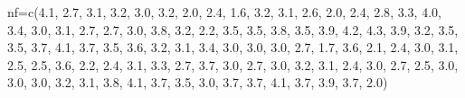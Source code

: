 \documentclass[
]{article}
\newenvironment{Shaded}{\begin{snugshade}}{\end{snugshade}}
\newcommand{\FloatTok}[1]{\textcolor[rgb]{0.00,0.00,0.81}{#1}}
\newcommand{\FunctionTok}[1]{\textcolor[rgb]{0.00,0.00,0.00}{#1}}
\newcommand{\NormalTok}[1]{#1}
\newcommand{\OtherTok}[1]{\textcolor[rgb]{0.56,0.35,0.01}{#1}}
\begin{document}
\begin{Shaded}
\begin{Highlighting}[]
\NormalTok{nf}\OtherTok{=}\FunctionTok{c}\NormalTok{(}\FloatTok{4.1}\NormalTok{, }\FloatTok{2.7}\NormalTok{, }\FloatTok{3.1}\NormalTok{, }\FloatTok{3.2}\NormalTok{, }\FloatTok{3.0}\NormalTok{, }\FloatTok{3.2}\NormalTok{, }\FloatTok{2.0}\NormalTok{, }\FloatTok{2.4}\NormalTok{, }\FloatTok{1.6}\NormalTok{, }\FloatTok{3.2}\NormalTok{, }\FloatTok{3.1}\NormalTok{, }\FloatTok{2.6}\NormalTok{, }\FloatTok{2.0}\NormalTok{, }\FloatTok{2.4}\NormalTok{, }\FloatTok{2.8}\NormalTok{, }
     \FloatTok{3.3}\NormalTok{, }\FloatTok{4.0}\NormalTok{, }\FloatTok{3.4}\NormalTok{, }\FloatTok{3.0}\NormalTok{, }\FloatTok{3.1}\NormalTok{, }\FloatTok{2.7}\NormalTok{, }\FloatTok{2.7}\NormalTok{, }\FloatTok{3.0}\NormalTok{, }\FloatTok{3.8}\NormalTok{, }\FloatTok{3.2}\NormalTok{, }\FloatTok{2.2}\NormalTok{, }\FloatTok{3.5}\NormalTok{, }\FloatTok{3.5}\NormalTok{, }\FloatTok{3.8}\NormalTok{, }\FloatTok{3.5}\NormalTok{, }
     \FloatTok{3.9}\NormalTok{, }\FloatTok{4.2}\NormalTok{, }\FloatTok{4.3}\NormalTok{, }\FloatTok{3.9}\NormalTok{, }\FloatTok{3.2}\NormalTok{, }\FloatTok{3.5}\NormalTok{, }\FloatTok{3.5}\NormalTok{, }\FloatTok{3.7}\NormalTok{, }\FloatTok{4.1}\NormalTok{, }\FloatTok{3.7}\NormalTok{, }\FloatTok{3.5}\NormalTok{, }\FloatTok{3.6}\NormalTok{, }\FloatTok{3.2}\NormalTok{, }\FloatTok{3.1}\NormalTok{, }\FloatTok{3.4}\NormalTok{, }
     \FloatTok{3.0}\NormalTok{, }\FloatTok{3.0}\NormalTok{, }\FloatTok{3.0}\NormalTok{, }\FloatTok{2.7}\NormalTok{, }\FloatTok{1.7}\NormalTok{, }\FloatTok{3.6}\NormalTok{, }\FloatTok{2.1}\NormalTok{, }\FloatTok{2.4}\NormalTok{, }\FloatTok{3.0}\NormalTok{, }\FloatTok{3.1}\NormalTok{, }\FloatTok{2.5}\NormalTok{, }\FloatTok{2.5}\NormalTok{, }\FloatTok{3.6}\NormalTok{, }\FloatTok{2.2}\NormalTok{, }\FloatTok{2.4}\NormalTok{, }
     \FloatTok{3.1}\NormalTok{, }\FloatTok{3.3}\NormalTok{, }\FloatTok{2.7}\NormalTok{, }\FloatTok{3.7}\NormalTok{, }\FloatTok{3.0}\NormalTok{, }\FloatTok{2.7}\NormalTok{, }\FloatTok{3.0}\NormalTok{, }\FloatTok{3.2}\NormalTok{, }\FloatTok{3.1}\NormalTok{, }\FloatTok{2.4}\NormalTok{, }\FloatTok{3.0}\NormalTok{, }\FloatTok{2.7}\NormalTok{, }\FloatTok{2.5}\NormalTok{, }\FloatTok{3.0}\NormalTok{, }\FloatTok{3.0}\NormalTok{, }
     \FloatTok{3.0}\NormalTok{, }\FloatTok{3.2}\NormalTok{, }\FloatTok{3.1}\NormalTok{, }\FloatTok{3.8}\NormalTok{, }\FloatTok{4.1}\NormalTok{, }\FloatTok{3.7}\NormalTok{, }\FloatTok{3.5}\NormalTok{, }\FloatTok{3.0}\NormalTok{, }\FloatTok{3.7}\NormalTok{, }\FloatTok{3.7}\NormalTok{, }\FloatTok{4.1}\NormalTok{, }\FloatTok{3.7}\NormalTok{, }\FloatTok{3.9}\NormalTok{, }\FloatTok{3.7}\NormalTok{, }\FloatTok{2.0}\NormalTok{)}
\end{Highlighting}
\end{Shaded}
\end{document}
